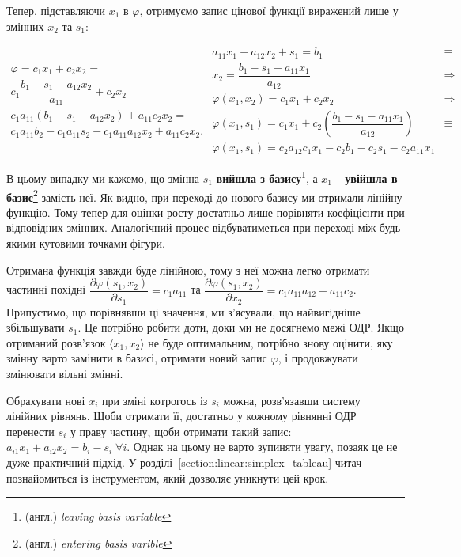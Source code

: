 \documentclass[\main/book.tex]{subfiles}
\begin{document}
Тепер, підставляючи $x_1$ в $\varphi$, отримуємо запис цінової функції виражений лише у змінних $x_2$ та $s_1$:
 
\[
  \begin{split}
   \varphi = c_1 x_1 + c_2 x_2 = \\
   c_1 \dfrac{b_1 - s_1 - a_{12} x_2}{a_{11}} + c_2 x_2 \\
   c_1 a_{11} (b_1 - s_1 - a_{12} x_2) + a_{11} c_2 x_2 = \\
   c_1 a_{11} b_2 - c_1 a_{11} s_2 - c_1 a_{11} a_{12} x_2 + a_{11} c_2 x_2.
  \end{split}
  \begin{array}{ll}
    a_{11} x_1 + a_{12} x_2 + s_1 = b_1          & \equiv      \\
    x_2 = \dfrac{b_1 - s_1 - a_{11} x_1}{a_{12}} & \Rightarrow \\
    \varphi(x_1, x_2) = c_1 x_1 + c_2 x_2        & \Rightarrow \\
    \varphi(x_1, s_1) = c_1 x_1 + c_2 \left(
      \dfrac{b_1 - s_1 - a_{11} x_1}{a_{12}}
    \right)                                      & \equiv      \\
    \varphi(x_1, s_1) =
    c_2 a_{12} c_1 x_1 - c_2 b_1 - c_2 s_1 - c_2 a_{11} x_1
  \end{array}
\]

В цьому випадку ми кажемо, що змінна $s_1$ \textbf{вийшла з базису}\footnote{(англ.) \textit{leaving basis variable}}, а $x_1$ -- \textbf{увійшла в базис}\footnote{(англ.) \textit{entering basis varible}} замість неї.
Як видно, при переході до нового базису ми отримали лінійну функцію. Тому тепер для оцінки росту достатньо лише порівняти коефіцієнти при відповідних змінних. Аналогічний процес відбуватиметься при переході між будь-якими кутовими точками фігури.

Отримана функція завжди буде лінійною, тому з неї можна легко отримати частинні похідні $\dfrac{\partial \varphi(s_1, x_2)}{\partial s_1} = c_1 a_{11}$ та $\dfrac{\partial \varphi(s_1, x_2)}{\partial x_2} = c_1 a_{11} a_{12} + a_{11} c_2$. Припустимо, що порівнявши ці значення, ми з'ясували, що найвигідніше збільшувати $s_1$. Це потрібно робити доти, доки ми не досягнемо межі ОДР. Якщо отриманий розв'язок ${\langle x_1, x_2 \rangle}$ не буде оптимальним, потрібно знову оцінити, яку змінну варто замінити в базисі, отримати новий запис $\varphi$, і продовжувати змінювати вільні змінні.

\begin{note}
 Обрахувати нові $x_i$ при зміні котрогось із $s_i$ можна, розв'язавши систему лінійних рівнянь. Щоби отримати її, достатньо у кожному рівнянні ОДР перенести $s_i$ у праву частину, щоби отримати такий запис: $a_{i1} x_1 + a_{i2} x_2 = b_i - s_i \; \forall i$. Однак на цьому не варто зупиняти увагу, позаяк це не дуже практичний підхід. У розділі~\ref{section:linear:simplex_tableau} читач познайомиться із інструментом, який дозволяє уникнути цей крок.
\end{note}
\end{document}
